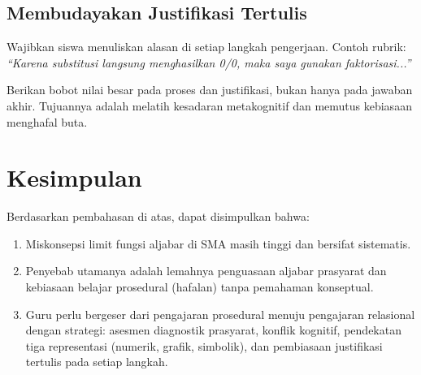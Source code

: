 \documentclass[12pt,a4paper,openany]{book}
\theoremstyle{definition}
\begin{document}
\section{Membudayakan Justifikasi Tertulis}

Wajibkan siswa menuliskan alasan di setiap langkah pengerjaan. Contoh rubrik: \textit{``Karena substitusi langsung menghasilkan 0/0, maka saya gunakan faktorisasi...''}

Berikan bobot nilai besar pada proses dan justifikasi, bukan hanya pada jawaban akhir. Tujuannya adalah melatih kesadaran metakognitif dan memutus kebiasaan menghafal buta.

\chapter{Kesimpulan}

Berdasarkan pembahasan di atas, dapat disimpulkan bahwa:
\begin{enumerate}
  \item Miskonsepsi limit fungsi aljabar di SMA masih tinggi dan bersifat sistematis.
  \item Penyebab utamanya adalah lemahnya penguasaan aljabar prasyarat dan kebiasaan belajar prosedural (hafalan) tanpa pemahaman konseptual.
  \item Guru perlu bergeser dari pengajaran prosedural menuju pengajaran relasional dengan strategi: asesmen diagnostik prasyarat, konflik kognitif, pendekatan tiga representasi (numerik, grafik, simbolik), dan pembiasaan justifikasi tertulis pada setiap langkah.
\end{enumerate}

\end{document}
